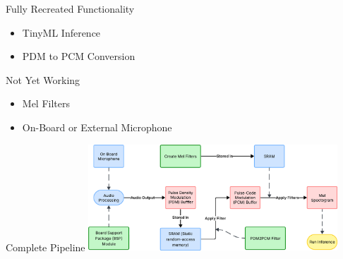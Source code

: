 


\begin{frame}{Fully Recreated Functionality}
    \begin{itemize}
        \item TinyML Inference
        \item PDM to PCM Conversion
    \end{itemize}    
\end{frame}

\begin{frame}{Not Yet Working}
    \begin{itemize}
        \item Mel Filters
        \item On-Board or External Microphone
    \end{itemize}    
\end{frame}

\begin{frame}{Complete Pipeline}
    \centering
    \includegraphics[height=0.7\textheight,width=0.7\textwidth,keepaspectratio]{pipeline.png}
\end{frame}